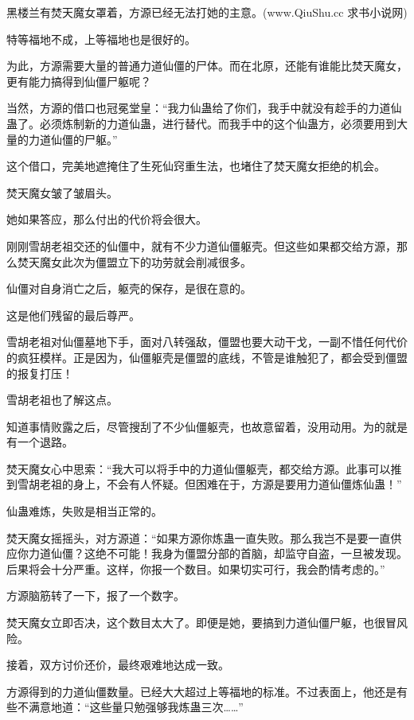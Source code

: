 
\begin{this_body}

黑楼兰有焚天魔女罩着，方源已经无法打她的主意。(www.QiuShu.cc 求书小说网)

特等福地不成，上等福地也是很好的。

为此，方源需要大量的普通力道仙僵的尸体。而在北原，还能有谁能比焚天魔女，更有能力搞得到仙僵尸躯呢？

当然，方源的借口也冠冕堂皇：“我力仙蛊给了你们，我手中就没有趁手的力道仙蛊了。必须炼制新的力道仙蛊，进行替代。而我手中的这个仙蛊方，必须要用到大量的力道仙僵的尸躯。”

这个借口，完美地遮掩住了生死仙窍重生法，也堵住了焚天魔女拒绝的机会。

焚天魔女皱了皱眉头。

她如果答应，那么付出的代价将会很大。

刚刚雪胡老祖交还的仙僵中，就有不少力道仙僵躯壳。但这些如果都交给方源，那么焚天魔女此次为僵盟立下的功劳就会削减很多。

仙僵对自身消亡之后，躯壳的保存，是很在意的。

这是他们残留的最后尊严。

雪胡老祖对仙僵墓地下手，面对八转强敌，僵盟也要大动干戈，一副不惜任何代价的疯狂模样。正是因为，仙僵躯壳是僵盟的底线，不管是谁触犯了，都会受到僵盟的报复打压！

雪胡老祖也了解这点。

知道事情败露之后，尽管搜刮了不少仙僵躯壳，也故意留着，没用动用。为的就是有一个退路。

焚天魔女心中思索：“我大可以将手中的力道仙僵躯壳，都交给方源。此事可以推到雪胡老祖的身上，不会有人怀疑。但困难在于，方源是要用力道仙僵炼仙蛊！”

仙蛊难炼，失败是相当正常的。

焚天魔女摇摇头，对方源道：“如果方源你炼蛊一直失败。那么我岂不是要一直供应你力道仙僵？这绝不可能！我身为僵盟分部的首脑，却监守自盗，一旦被发现。后果将会十分严重。这样，你报一个数目。如果切实可行，我会酌情考虑的。”

方源脑筋转了一下，报了一个数字。

焚天魔女立即否决，这个数目太大了。即便是她，要搞到力道仙僵尸躯，也很冒风险。

接着，双方讨价还价，最终艰难地达成一致。

方源得到的力道仙僵数量。已经大大超过上等福地的标准。不过表面上，他还是有些不满意地道：“这些量只勉强够我炼蛊三次……”


\end{this_body}
